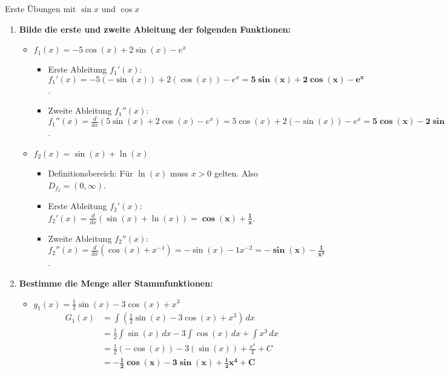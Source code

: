 \begin{loesungsumgebung}{Erste Übungen mit $\sin x$ und $\cos x$}

\begin{enumerate}[label=(\alph*)]
    \item \textbf{Bilde die erste und zweite Ableitung der folgenden Funktionen:}
    \begin{itemize}
        \item \textbf{$f_1(x) = -5\cos(x) + 2\sin(x) - e^x$}
        \begin{itemize}
            \item Erste Ableitung $f_1'(x)$:
            $f_1'(x) = -5(-\sin(x)) + 2(\cos(x)) - e^x = \mathbf{5\sin(x) + 2\cos(x) - e^x}$.
            \item Zweite Ableitung $f_1''(x)$:
            $f_1''(x) = \frac{d}{dx}(5\sin(x) + 2\cos(x) - e^x) = 5\cos(x) + 2(-\sin(x)) - e^x = \mathbf{5\cos(x) - 2\sin(x) - e^x}$.
        \end{itemize}

        \item \textbf{$f_2(x) = \sin(x) + \ln(x)$}
        \begin{itemize}
            \item Definitionsbereich: Für $\ln(x)$ muss $x>0$ gelten. Also $D_{f_2} = (0, \infty)$.
            \item Erste Ableitung $f_2'(x)$:
            $f_2'(x) = \frac{d}{dx}(\sin(x) + \ln(x)) = \mathbf{\cos(x) + \frac{1}{x}}$.
            \item Zweite Ableitung $f_2''(x)$:
            $f_2''(x) = \frac{d}{dx}(\cos(x) + x^{-1}) = -\sin(x) - 1x^{-2} = \mathbf{-\sin(x) - \frac{1}{x^2}}$.
        \end{itemize}
    \end{itemize}

    \item \textbf{Bestimme die Menge aller Stammfunktionen:}
    \begin{itemize}
        \item \textbf{$g_1(x) = \frac{1}{2}\sin(x) - 3\cos(x) + x^3$}
        \begin{align*} G_1(x) &= \int \left(\frac{1}{2}\sin(x) - 3\cos(x) + x^3\right) \,dx \\ &= \frac{1}{2}\int \sin(x) \,dx - 3\int \cos(x) \,dx + \int x^3 \,dx \\ &= \frac{1}{2}(-\cos(x)) - 3(\sin(x)) + \frac{x^4}{4} + C \\ &= \mathbf{-\frac{1}{2}\cos(x) - 3\sin(x) + \frac{1}{4}x^4 + C} \end{align*}


\end{itemize}
\end{enumerate}
\end{loesungsumgebung}
